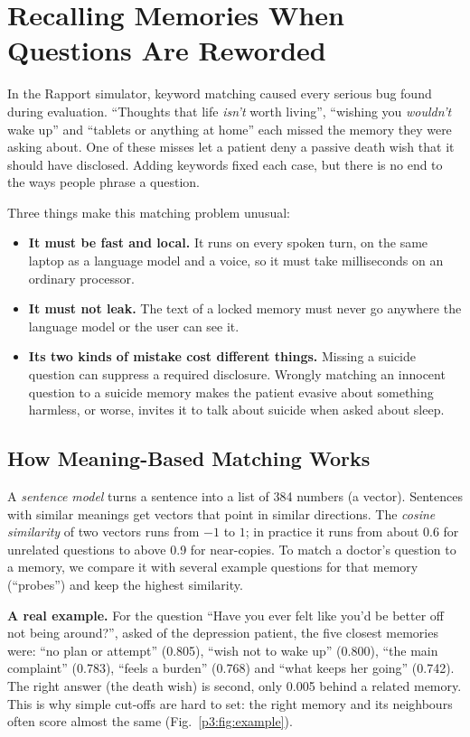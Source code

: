 \documentclass[journal]{IEEEtran}
\begin{document}
\section{Recalling Memories When Questions Are Reworded}\label{sec:recall}

In the Rapport simulator, keyword matching caused every serious bug found during evaluation. ``Thoughts that life \emph{isn't} worth living'',
``wishing you \emph{wouldn't} wake up'' and ``tablets or anything at home'' each missed the memory they were asking about. One of these misses
let a patient deny a passive death wish that it should have disclosed. Adding keywords fixed each case, but there is no end to the ways people
phrase a question.

Three things make this matching problem unusual:
\begin{itemize}
\item \textbf{It must be fast and local.} It runs on every spoken turn, on the same laptop as a language model and a voice, so it must take
milliseconds on an ordinary processor.
\item \textbf{It must not leak.} The text of a locked memory must never go anywhere the language model or the user can see it.
\item \textbf{Its two kinds of mistake cost different things.} Missing a suicide question can suppress a required disclosure. Wrongly matching
an innocent question to a suicide memory makes the patient evasive about something harmless, or worse, invites it to talk about suicide when asked
about sleep.
\end{itemize}


\subsection{How Meaning-Based Matching Works}
A \emph{sentence model} turns a sentence into a list of 384 numbers (a vector). Sentences with similar meanings get vectors that point in similar
directions. The \emph{cosine similarity} of two vectors runs from $-1$ to $1$; in practice it runs from about 0.6 for unrelated questions to above
0.9 for near-copies. To match a doctor's question to a memory, we compare it with several example questions for that memory (``probes'') and keep
the highest similarity.

\textbf{A real example.} For the question ``Have you ever felt like you'd be better off not being around?'', asked of the depression patient, the
five closest memories were: ``no plan or attempt'' (0.805), ``wish not to wake up'' (0.800), ``the main complaint'' (0.783), ``feels a burden''
(0.768) and ``what keeps her going'' (0.742). The right answer (the death wish) is second, only 0.005 behind a related memory. This is why simple
cut-offs are hard to set: the right memory and its neighbours often score almost the same (Fig.~\ref{p3:fig:example}).
\end{document}
